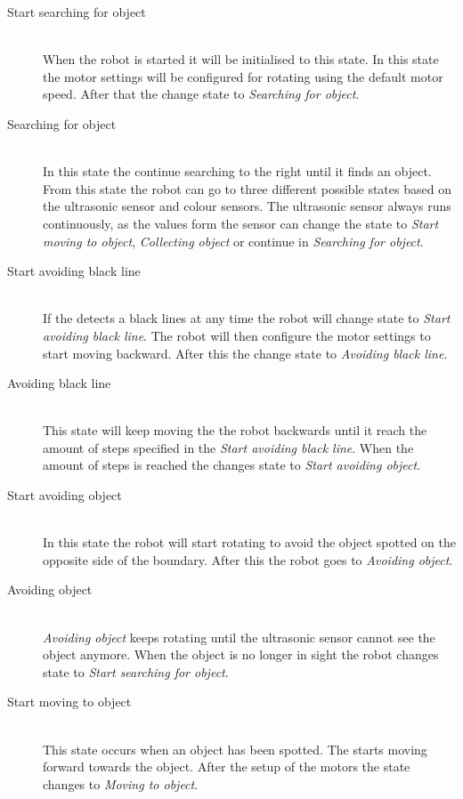 \begin{description}
\item[Start searching for object] \hfill \\
When the robot is started it will be initialised to this state. In this state the motor settings will be configured for rotating using the default motor speed. After that the \projname{} change state to \emph{Searching for object}.

\item[Searching for object] \hfill \\
In this state the \projname{} continue searching to the right until it finds an object. From this state the robot can go to three different possible states based on the ultrasonic sensor and colour sensors. The ultrasonic sensor always runs continuously, as the values form the sensor can change the state to \emph{Start moving to object}, \emph{Collecting object} or continue in \emph{Searching for object}. 

\item[Start avoiding black line] \hfill \\
If the \projname{} detects a black lines at any time the robot will change state to \emph{Start avoiding black line}. The robot will then configure the motor settings to start moving backward. After this the \projname{} change state to \emph{Avoiding black line}. 

\item[Avoiding black line] \hfill \\
This state will keep moving the the robot backwards until it reach the amount of steps specified in the \emph{Start avoiding black line}. When the amount of steps is reached the \projname{} changes state to \emph{Start avoiding object}.

\item[Start avoiding object] \hfill \\
In this state the robot will start rotating to avoid the object spotted on the opposite side of the boundary. After this the robot goes to \emph{Avoiding object}. 

\item[Avoiding object] \hfill \\
\emph{Avoiding object} keeps rotating until the ultrasonic sensor cannot see the object anymore. When the object is no longer in sight the robot changes state to \emph{Start searching for object}.

\item[Start moving to object] \hfill \\
This state occurs when an object has been spotted. The \projname{} starts moving forward towards the object. After the setup of the motors the state changes to \emph{Moving to object}.


\end{description}
